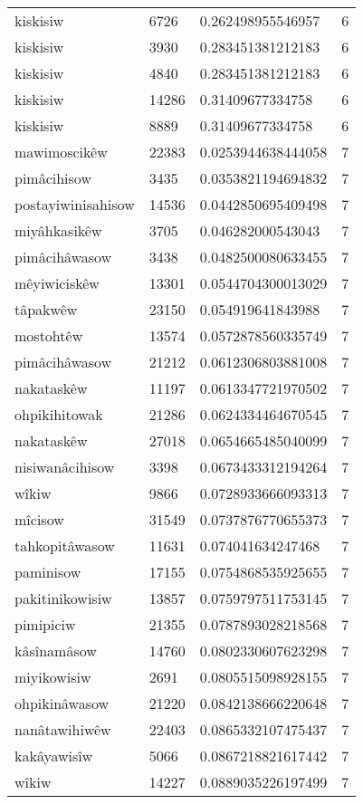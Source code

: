 \begin{longtable}{llll}
kiskisiw & 6726 & 0.262498955546957 & 6 \\
kiskisiw & 3930 & 0.283451381212183 & 6 \\
kiskisiw & 4840 & 0.283451381212183 & 6 \\
kiskisiw & 14286 & 0.31409677334758 & 6 \\
kiskisiw & 8889 & 0.31409677334758 & 6 \\
mawimoscikêw & 22383 & 0.0253944638444058 & 7 \\
pimâcihisow & 3435 & 0.0353821194694832 & 7 \\
postayiwinisahisow & 14536 & 0.0442850695409498 & 7 \\
miyâhkasikêw & 3705 & 0.046282000543043 & 7 \\
pimâcihâwasow & 3438 & 0.0482500080633455 & 7 \\
mêyiwiciskêw & 13301 & 0.0544704300013029 & 7 \\
tâpakwêw & 23150 & 0.054919641843988 & 7 \\
mostohtêw & 13574 & 0.0572878560335749 & 7 \\
pimâcihâwasow & 21212 & 0.0612306803881008 & 7 \\
nakataskêw & 11197 & 0.0613347721970502 & 7 \\
ohpikihitowak & 21286 & 0.0624334464670545 & 7 \\
nakataskêw & 27018 & 0.0654665485040099 & 7 \\
nisiwanâcihisow & 3398 & 0.0673433312194264 & 7 \\
wîkiw & 9866 & 0.0728933666093313 & 7 \\
mîcisow & 31549 & 0.0737876770655373 & 7 \\
tahkopitâwasow & 11631 & 0.074041634247468 & 7 \\
paminisow & 17155 & 0.0754868535925655 & 7 \\
pakitinikowisiw & 13857 & 0.0759797511753145 & 7 \\
pimipiciw & 21355 & 0.0787893028218568 & 7 \\
kâsînamâsow & 14760 & 0.0802330607623298 & 7 \\
miyikowisiw & 2691 & 0.0805515098928155 & 7 \\
ohpikinâwasow & 21220 & 0.0842138666220648 & 7 \\
nanâtawihiwêw & 22403 & 0.0865332107475437 & 7 \\
kakâyawisîw & 5066 & 0.0867218821617442 & 7 \\
wîkiw & 14227 & 0.0889035226197499 & 7 \\

\end{longtable}
